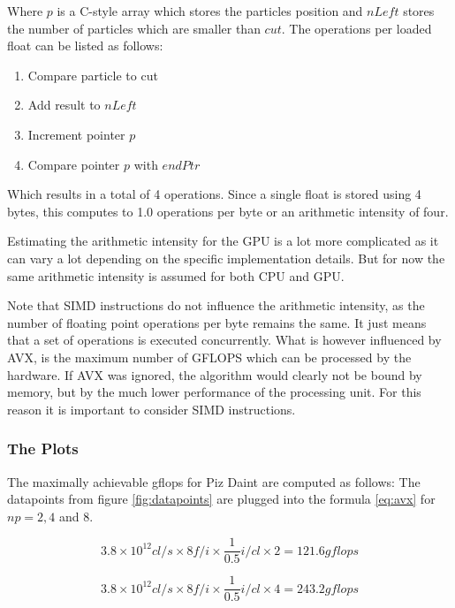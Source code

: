 \documentclass[]{article}
\begin{document}
Where $p$ is a C-style array which stores the particles position and $nLeft$ stores the number of particles which are smaller than $cut$. The operations per loaded float can be listed as follows:

\begin{enumerate}
	\item Compare particle to cut
	\item Add result to $nLeft$
	\item Increment pointer $p$
	\item Compare pointer $p$ with $endPtr$
\end{enumerate}

Which results in a total of 4 operations. Since a single float is stored using 4 bytes, this computes to 1.0 operations per byte or an arithmetic intensity of four. 

Estimating the arithmetic intensity for the GPU is a lot more complicated as it can vary a lot depending on the specific implementation details. But for now the same arithmetic intensity is assumed for both CPU and GPU. 

Note that SIMD instructions do not influence the arithmetic intensity, as the number of floating point operations per byte remains the same. It just means that a set of operations is executed concurrently. What is however influenced by AVX, is the maximum number of GFLOPS which can be processed by the hardware. If AVX was ignored, the algorithm would clearly not be bound by memory, but by the much lower performance of the processing unit. For this reason it is important to consider SIMD instructions.

\subsubsection{The Plots}

The maximally achievable gflops for Piz Daint are computed as follows: The datapoints from figure \ref{fig:datapoints} are plugged into the formula \ref{eq:avx} for $np = 2, 4$ and $8$.

\begin{center}
	\begin{equation}
		3.8 \times 10^{12} cl/s \times 8 f/i \times \frac{1}{0.5} i/cl \times 2  = 121.6 gflops
	\end{equation}
	\label{eq:daintp1}
\end{center}

\begin{center}
	\begin{equation}
		3.8 \times 10^{12} cl/s \times 8 f/i \times \frac{1}{0.5} i/cl \times 4 = 243.2 gflops
	\end{equation}
	\label{eq:daintp2}
\end{center}
\end{document}
